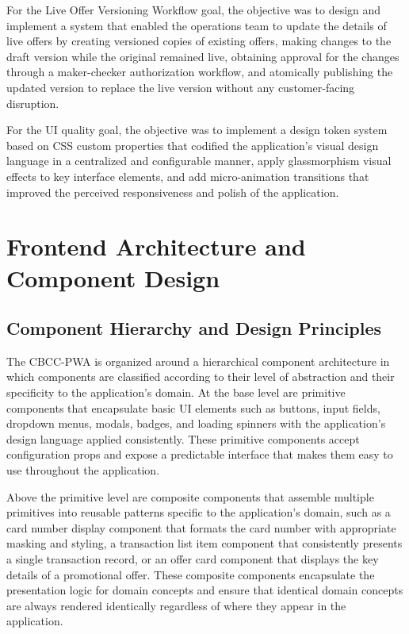 For the Live Offer Versioning Workflow goal, the objective was to design and implement a system that enabled the operations team to update the details of live offers by creating versioned copies of existing offers, making changes to the draft version while the original remained live, obtaining approval for the changes through a maker-checker authorization workflow, and atomically publishing the updated version to replace the live version without any customer-facing disruption.

For the UI quality goal, the objective was to implement a design token system based on CSS custom properties that codified the application's visual design language in a centralized and configurable manner, apply glassmorphism visual effects to key interface elements, and add micro-animation transitions that improved the perceived responsiveness and polish of the application.

\section{Frontend Architecture and Component Design}

\subsection{Component Hierarchy and Design Principles}

The CBCC-PWA is organized around a hierarchical component architecture in which components are classified according to their level of abstraction and their specificity to the application's domain. At the base level are primitive components that encapsulate basic UI elements such as buttons, input fields, dropdown menus, modals, badges, and loading spinners with the application's design language applied consistently. These primitive components accept configuration props and expose a predictable interface that makes them easy to use throughout the application.

Above the primitive level are composite components that assemble multiple primitives into reusable patterns specific to the application's domain, such as a card number display component that formats the card number with appropriate masking and styling, a transaction list item component that consistently presents a single transaction record, or an offer card component that displays the key details of a promotional offer. These composite components encapsulate the presentation logic for domain concepts and ensure that identical domain concepts are always rendered identically regardless of where they appear in the application.


